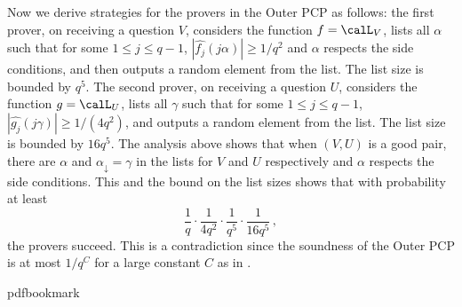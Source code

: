 %
Now we derive strategies for the provers in the Outer PCP as follows: the first prover,
on receiving a question $V$, considers the function $f = \calL_V$,
lists all $\alpha$ such that for some $1 \leq j \leq q-1$, $|\widehat{f_j}(j\alpha)| \geq {1}/{q^2}$ and $\alpha$ respects the side conditions, and
then outputs a random element from the list. The list size is bounded by $q^5$.
The second prover, on receiving a question $U$, considers the function
$g = \calL_U$,
lists all $\gamma$
such that for some $1 \leq j \leq q-1$, $|\widehat{g_j}(j\gamma)| \geq {1}/{(4q^2)}$, and
outputs a random element from the list. The list size is bounded by $16q^5$.
The analysis above shows that when $(V,U)$ is a good pair, there are $\alpha$
and $\alpha_\downarrow = \gamma$ in the lists for $V$ and $U$ respectively and $\alpha$
respects the side conditions. This and the bound on the list sizes
shows that with probability at least 
\[
\frac{1}{q}\cdot \frac{1}{4q^2} \cdot\frac{1}{q^5}
\cdot \frac{1}{16q^5}\,,
\]
the provers succeed. This is a contradiction since the
soundness of the Outer PCP is at most ${1}/{q^C}$ for a large constant $C$ as in
.

%
%
%
%
%
\providecommand{\bibhead}[1]{}
%
\expandafter\ifx\csname pdfbookmark\endcsname\relax%
  \providecommand{\tocrefpdfbookmark}{}
\else\providecommand{\tocrefpdfbookmark}{%
   \hypertarget{tocreferences}{}%
   \pdfbookmark[1]{References}{tocreferences}}%
\fi

